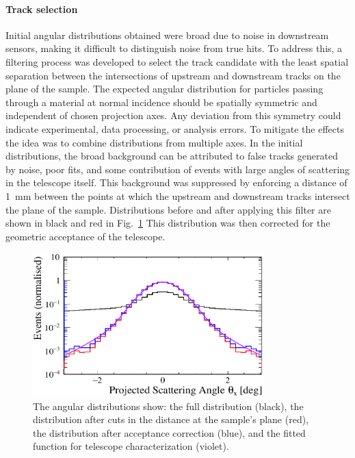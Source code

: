 \begin{refsection}
        \paragraph{Track selection}
        Initial angular distributions obtained were broad due to noise in downstream sensors, making it difficult to distinguish noise from true hits. 
        To address this, a filtering process was developed to select the track candidate with the least spatial separation between the intersections of upstream and downstream tracks on the plane of the sample.
        The expected angular distribution for particles passing through a material at normal incidence should be spatially symmetric and independent of chosen projection axes. 
        Any deviation from this symmetry could indicate experimental, data processing, or analysis errors. 
        To mitigate the effects the idea was to combine distributions from multiple axes.
        In the initial distributions, the broad background can be attributed to false tracks generated by noise, poor fits, and some contribution of events with large angles of scattering in the telescope itself. 
        This background was suppressed by enforcing a distance of \SI{1}{mm} between the points at which the upstream and downstream tracks intersect the plane of the sample.        
        Distributions before and after applying this filter are shown in black and red in Fig.~\ref{fig:muEDM:beamtime2021:distributions}
        This distribution was then corrected for the geometric acceptance of the telescope.
        \begin{figure}
            \centering
            \includegraphics[width=0.8\textwidth]{Figures/muEDM_Dec2021/distributions.png}
            \caption{The angular distributions show: the full distribution (black), the distribution after cuts in the distance at the sample's plane (red), the distribution after acceptance correction (blue), and the fitted function for telescope characterization (violet).}
            \label{fig:muEDM:beamtime2021:distributions}
        \end{figure}
        

\end{refsection}
